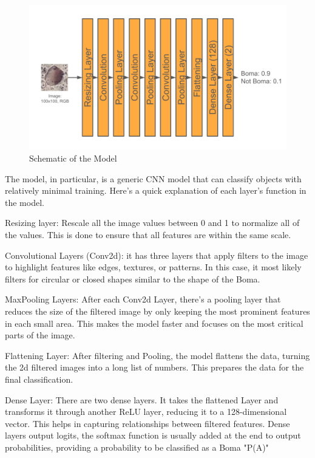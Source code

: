 \documentclass[10pt]{article}
\begin{document}
\begin{figure} [H] %
    \centering
    \includegraphics[width=1\linewidth]{images/Model Shape.png}
    \caption{Schematic of the Model}
    \label{fig:model_shape}
\end{figure}

The model, in particular, is a generic CNN model that can classify objects with relatively minimal training. Here's a quick explanation of each layer's function in the model.

Resizing layer: Rescale all the image values between 0 and 1 to normalize all of the values. This is done to ensure that all features are within the same scale.

Convolutional Layers (Conv2d): it has three layers that apply filters to the image to highlight features like edges, textures, or patterns. In this case, it most likely filters for circular or closed shapes similar to the shape of the Boma.

MaxPooling Layers: After each Conv2d Layer, there's a pooling layer that reduces the size of the filtered image by only keeping the most prominent features in each small area. This makes the model faster and focuses on the most critical parts of the image.

Flattening Layer: After filtering and Pooling, the model flattens the data, turning the 2d filtered images into a long list of numbers. This prepares the data for the final classification.

Dense Layer: There are two dense layers. It takes the flattened Layer and transforms it through another ReLU layer, reducing it to a 128-dimensional vector. This helps in capturing relationships between filtered features. Dense layers output logits, the softmax function is usually added at the end to output probabilities, providing a probability to be classified as a Boma "P(A)"
\end{document}
